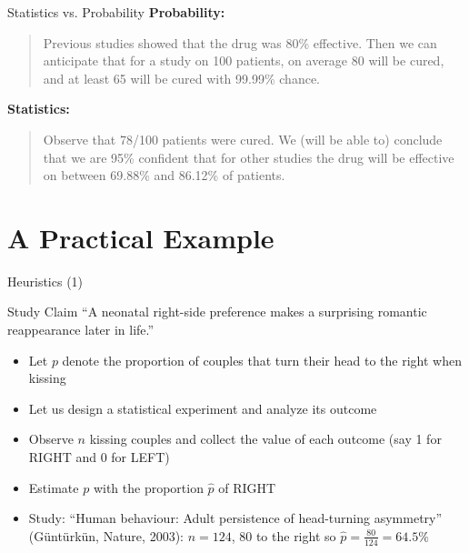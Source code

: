 \documentclass[aspectratio=169]{beamer}
\begin{document}
\begin{frame}{Statistics vs. Probability}
\textbf{Probability:}
\begin{quote}
Previous studies showed that the drug was 80\% effective. Then we can anticipate that for a study on 100 patients, on average 80 will be cured, and at least 65 will be cured with 99.99\% chance.
\end{quote}

\vspace{0.5cm}

\textbf{Statistics:}
\begin{quote}
Observe that 78/100 patients were cured. We (will be able to) conclude that we are 95\% confident that for other studies the drug will be effective on between 69.88\% and 86.12\% of patients.
\end{quote}
\end{frame}

\section{A Practical Example}

\begin{frame}{Heuristics (1)}
\begin{alertblock}{Study Claim}
``A neonatal right-side preference makes a surprising romantic reappearance later in life.''
\end{alertblock}

\vspace{0.3cm}

\begin{itemize}
    \item Let $p$ denote the proportion of couples that turn their head to the right when kissing
    \item Let us design a statistical experiment and analyze its outcome
    \item Observe $n$ kissing couples and collect the value of each outcome (say 1 for RIGHT and 0 for LEFT)
    \item Estimate $p$ with the proportion $\hat{p}$ of RIGHT
    \item Study: ``Human behaviour: Adult persistence of head-turning asymmetry'' (Güntürkün, Nature, 2003): $n = 124$, 80 to the right so $\hat{p} = \frac{80}{124} = 64.5\%$
\end{itemize}
\end{frame}
\end{document}
